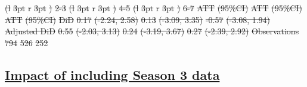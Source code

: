 \documentclass[
  letterpaper,
  DIV=11,
  numbers=noendperiod]{scrartcl}
\providecommand{\DIFadd}[1]{{\protect\color{blue}\underline{#1}}} %
\providecommand{\DIFdel}[1]{{\protect\color{red}\sout{#1}}}                      %
\providecommand{\DIFaddbegin}{} %
\providecommand{\DIFaddend}{} %
\providecommand{\DIFdelbegin}{} %
\providecommand{\DIFdelend}{} %
\providecommand{\DIFdelFL}[1]{\DIFdel{#1}} %
\newcommand{\DIFscaledelfig}{0.5}
\newlength{\DIFdelgraphicswidth} %
\newlength{\DIFdelgraphicsheight} %
\newcommand{\DIFaddincludegraphics}[2][]{{\color{blue}\fbox{\DIFOincludegraphics[#1]{#2}}}} %
\newcommand{\DIFdelincludegraphics}[2][]{%
\sbox{\DIFdelgraphicsbox}{\DIFOincludegraphics[#1]{#2}}%
\settoboxwidth{\DIFdelgraphicswidth}{\DIFdelgraphicsbox} %
\settoboxtotalheight{\DIFdelgraphicsheight}{\DIFdelgraphicsbox} %
\scalebox{\DIFscaledelfig}{%
\parbox[b]{\DIFdelgraphicswidth}{\usebox{\DIFdelgraphicsbox}\\[-\baselineskip] \rule{\DIFdelgraphicswidth}{0em}}\llap{\resizebox{\DIFdelgraphicswidth}{\DIFdelgraphicsheight}{%
\setlength{\unitlength}{\DIFdelgraphicswidth}%
\begin{picture}(1,1)%
\thicklines\linethickness{2pt} %
{\color[rgb]{1,0,0}\put(0,0){\framebox(1,1){}}}%
{\color[rgb]{1,0,0}\put(0,0){\line( 1,1){1}}}%
{\color[rgb]{1,0,0}\put(0,1){\line(1,-1){1}}}%
\end{picture}%
}\hspace*{3pt}}} %
} %
\DeclareRobustCommand{\DIFaddbegin}{\DIFOaddbegin \let\includegraphics\DIFaddincludegraphics} %
\DeclareRobustCommand{\DIFaddend}{\DIFOaddend \let\includegraphics\DIFOincludegraphics} %
\DeclareRobustCommand{\DIFdelbegin}{\DIFOdelbegin \let\includegraphics\DIFdelincludegraphics} %
\DeclareRobustCommand{\DIFdelend}{\DIFOaddend \let\includegraphics\DIFOincludegraphics} %
\begin{document}
\DIFdelFL{(l}%
\DIFdelFL{3pt}%
\DIFdelFL{r}%
\DIFdelFL{3pt}%
\DIFdelFL{)}%
\DIFdelFL{2-3}%
\DIFdelFL{(l}%
\DIFdelFL{3pt}%
\DIFdelFL{r}%
\DIFdelFL{3pt}%
\DIFdelFL{)}%
\DIFdelFL{4-5}%
\DIFdelFL{(l}%
\DIFdelFL{3pt}%
\DIFdelFL{r}%
\DIFdelFL{3pt}%
\DIFdelFL{)}%
\DIFdelFL{6-7}%
\DIFdelFL{ATT }%
\DIFdelFL{(95\%CI) }%
\DIFdelFL{ATT }%
\DIFdelFL{(95\%CI) }%
\DIFdelFL{ATT }%
\DIFdelFL{(95\%CI)}%
\DIFdelFL{DiD }%
\DIFdelFL{0.17 }%
\DIFdelFL{(-2.24, 2.58) }%
\DIFdelFL{0.13 }%
\DIFdelFL{(-3.09, 3.35) }%
\DIFdelFL{-0.57 }%
\DIFdelFL{(-3.08, 1.94)}%
\DIFdelFL{Adjusted DiD }%
\DIFdelFL{0.55 }%
\DIFdelFL{(-2.03, 3.13) }%
\DIFdelFL{0.24 }%
\DIFdelFL{(-3.19, 3.67) }%
\DIFdelFL{0.27 }%
\DIFdelFL{(-2.39, 2.92)}%
\DIFdelFL{Observations }%
\DIFdelFL{794 }%
\DIFdelFL{526 }%
\DIFdelFL{252 }%

\DIFdelend \newpage

\DIFdelbegin %
\DIFdelend \DIFaddbegin \subsection{\DIFadd{Impact of including Season 3
data}}\label{impact-of-including-season-3-data}
\DIFaddend 
\end{document}
